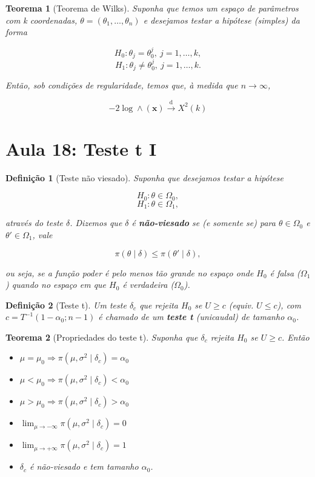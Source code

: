\documentclass{article}
\newtheorem{theorem}{Teorema}
\newtheorem{definition}{Definição}
\begin{document}
\begin{theorem}[Teorema de Wilks]
Suponha que temos um espaço de parâmetros com k coordenadas, $\theta = (\theta_1, \ldots, \theta_n)$ e desejamos testar a hipótese (simples) da forma

$$H_0 : \theta_j = \theta_0^j, \ j = 1, \ldots, k,$$
$$H_1 : \theta_j \neq \theta_0^j, \ j = 1, \ldots, k.$$

Então, sob condições de regularidade, temos que, à medida que $n \rightarrow \infty$,

$$-2 \log \wedge(\textbf{x}) \stackrel{\mathrm{d}}{\rightarrow} X^2 (k)$$
\end{theorem}

\section*{Aula 18: Teste t I}\label{s18}
\begin{definition}[Teste não viesado]
Suponha que desejamos testar a hipótese

$$H_0 : \theta \in \Omega_0,$$
$$H_1 : \theta \in \Omega_1,$$

através do teste $\delta$. Dizemos que $\delta$ é \textbf{não-viesado} se (e somente se) para $\theta \in \Omega_0$ e $\theta' \in \Omega_1$, vale

$$\pi (\theta \mid \delta) \leq \pi (\theta' \mid \delta),$$

ou seja, se a função poder é pelo menos tão grande no espaço onde $H_0$ é falsa ($\Omega_1$) quando no espaço em que $H_0$ é verdadeira ($\Omega_0$).
\end{definition}

\begin{definition}[Teste t]
Um teste $\delta_c$ que rejeita $H_0$ se $U \geq c$ (equiv. $U \leq c$), com $c = T^{-1}(1 - \alpha_0; n - 1)$ é chamado de um \textbf{teste t} (unicaudal) de tamanho $\alpha_0$.
\end{definition}

\begin{theorem}[Propriedades do teste t]
Suponha que $\delta_c$ rejeita $H_0$ se $U \geq c$. Então

\begin{itemize}
    \item $\mu = \mu_0 \Longrightarrow \pi(\mu, \sigma^2 \mid \delta_c) = \alpha_0$
    
    \item $\mu < \mu_0 \Longrightarrow \pi(\mu, \sigma^2 \mid \delta_c) < \alpha_0$
    
    \item $\mu > \mu_0 \Longrightarrow \pi(\mu, \sigma^2 \mid \delta_c) > \alpha_0$
    
    \item $\lim_{\mu \rightarrow -\infty} \pi(\mu, \sigma^2 \mid \delta_c) = 0$
    
    \item $\lim_{\mu \rightarrow +\infty} \pi(\mu, \sigma^2 \mid \delta_c) = 1$
    
    \item $\delta_c$ é não-viesado e tem tamanho $\alpha_0$.
\end{itemize}
\end{theorem}
\end{document}
